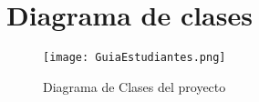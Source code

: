\section{Diagrama de clases}

\begin{figure}[H]
	\centering
	\texttt{[image: GuiaEstudiantes.png]}
	\caption{Diagrama de Clases del proyecto}
\end{figure}
